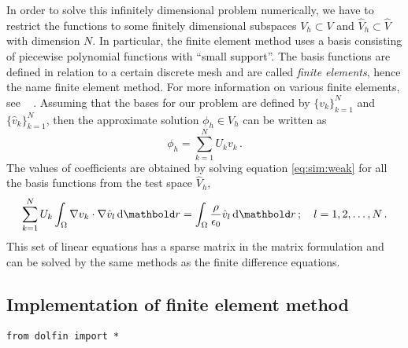 In order to solve this infinitely dimensional problem numerically, we have to restrict the
functions to some finitely dimensional subspaces $V_h \subset V$ and $\hat V_h\subset\hat V$ with
dimension $N$. In particular, the finite element method uses a basis consisting of piecewise
polynomial functions with ``small support''. The basis functions are defined in relation
to a certain discrete mesh and are called {\em finite elements}, hence the name finite element
method. For more information on various finite elements, see \eg\ \citep{fenicsbook}
.
Assuming that the bases for our problem are defined by
 $\{v_k\}_{k=1}^N$ and $\{\hat v_k\}_{k=1}^N$, then the approximate
solution $\phi_h \in V_h$ can be written as
\begin{equation}
\phi_h = \sum_{k=1}^N U_k v_k\,.
\end{equation}
The values of coefficients are obtained by solving equation \eqref{eq:sim:weak} for all the
basis functions from the test space $\hat V_h$, \ie
\begin{equation}
\sum_{k=1}^N U_k\int_\Omega \nabla v_k\cdot\nabla \hat v_l\de\mb r =
 \int_\Omega\frac{\rho}{\epsilon_0} \hat v_l \de\mb r\,;\quad l=1,2,\ldots,N\,.
\end{equation}
This set of linear equations has a sparse matrix in the matrix formulation and can be solved
by the same methods as the finite difference equations.

\subsection{Implementation of finite element method}
\lstset{language=python}
\begin{lstlisting}
from dolfin import *
\end{lstlisting}


